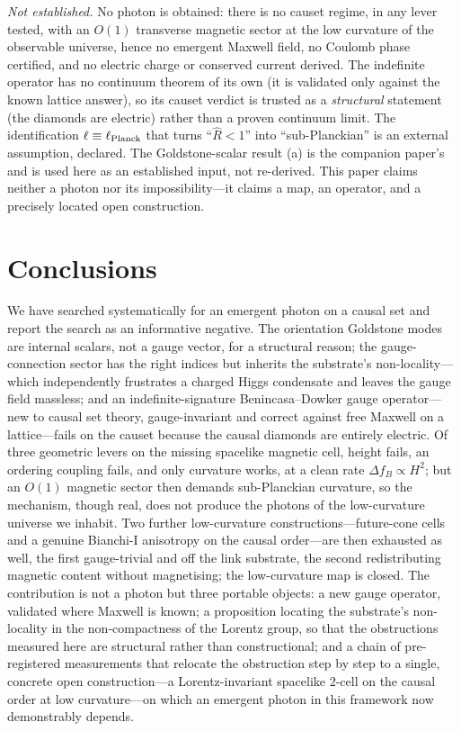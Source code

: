 \documentclass[aps,prd,reprint,nofootinbib,superscriptaddress,floatfix]{revtex4-2}
\newcommand{\Rhat}{\hat R}
\newcommand{\fracB}{f_{\!B}}
\newcounter{proposition}
\begin{document}
\emph{Not established.} No photon is obtained: there is no causet regime, in any lever
tested, with an $O(1)$ transverse magnetic sector at the low curvature of the observable
universe, hence no emergent Maxwell field, no Coulomb phase certified, and no electric
charge or conserved current derived. The indefinite operator has no continuum theorem of
its own (it is validated only against the known lattice answer), so its causet verdict is
trusted as a \emph{structural} statement (the diamonds are electric) rather than a proven
continuum limit. The identification $\ell\equiv\ell_{\rm Planck}$ that turns ``$\Rhat<1$''
into ``sub-Planckian'' is an external assumption, declared. The Goldstone-scalar result
(a) is the companion paper's \cite{GoldstonePRD} and is used here as an established
input, not re-derived. This paper claims neither a photon nor its impossibility---it
claims a map, an operator, and a precisely located open construction.

\section{Conclusions}\label{sec:conclusions}

We have searched systematically for an emergent photon on a causal set and report the
search as an informative negative. The orientation Goldstone modes are internal scalars,
not a gauge vector, for a structural reason; the gauge-connection sector has the right
indices but inherits the substrate's non-locality---which independently frustrates a
charged Higgs condensate and leaves the gauge field massless; and an indefinite-signature
Benincasa--Dowker gauge operator---new to causal set theory, gauge-invariant and
correct against free Maxwell on a lattice---fails on the causet because the causal
diamonds are entirely electric. Of three geometric levers on the missing spacelike
magnetic cell, height fails, an ordering coupling fails, and only curvature works, at a
clean rate $\Delta\fracB\propto H^2$; but an $O(1)$ magnetic sector then demands
sub-Planckian curvature, so the mechanism, though real, does not produce the photons of
the low-curvature universe we inhabit. Two further low-curvature constructions---future-cone
cells and a genuine Bianchi-I anisotropy on the causal order---are then exhausted as well,
the first gauge-trivial and off the link substrate, the second redistributing magnetic
content without magnetising; the low-curvature map is closed. The contribution is not a photon but three portable
objects: a new gauge operator, validated where Maxwell is known; a proposition locating
the substrate's non-locality in the non-compactness of the Lorentz group, so that the
obstructions measured here are structural rather than constructional; and a chain of
pre-registered measurements that relocate the obstruction step by step to a single,
concrete open construction---a Lorentz-invariant spacelike $2$-cell on the causal order
at low curvature---on which an emergent photon in this framework now demonstrably
depends.
\end{document}
